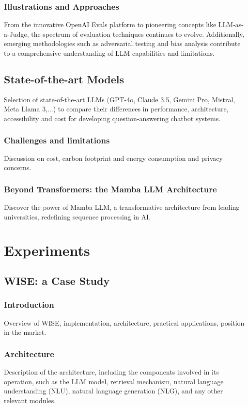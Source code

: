 \documentclass[12pt]{article}
\begin{document}
\subsubsection{Illustrations and Approaches}

From the innovative OpenAI Evals platform to pioneering concepts like LLM-as-a-Judge, the spectrum of evaluation techniques continues to evolve. Additionally, emerging methodologies such as adversarial testing and bias analysis contribute to a comprehensive understanding of LLM capabilities and limitations.

\subsection{State-of-the-art Models}
Selection of state-of-the-art LLMs (GPT-4o, Claude 3.5, Gemini Pro, Mistral, Meta Llama 3,...) to compare their differences in performance, architecture, accessibility and cost for developing question-answering chatbot systems.

\subsubsection{Challenges and limitations}
Discussion on cost, carbon footprint and energy consumption and privacy concerns.

\subsubsection{Beyond Transformers: the Mamba LLM Architecture}
Discover the power of Mamba LLM, a transformative architecture from leading universities, redefining sequence processing in AI.

\section{Experiments}
\subsection{WISE: a Case Study}
\subsubsection{Introduction}


Overview of WISE, implementation, architecture, practical applications, position in the market.

\subsubsection{Architecture}
Description of the architecture, including the components involved in its operation, such as the LLM model, retrieval mechanism, natural language understanding (NLU), natural language generation (NLG), and any other relevant modules.
\end{document}
